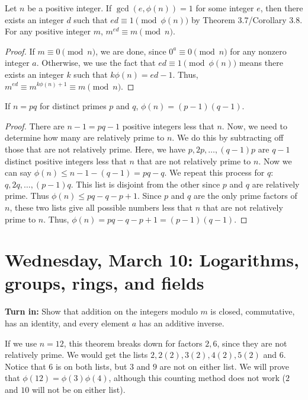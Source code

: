 \documentclass[letterpaper, 11 pt]{article}
\begin{document}
\begin{lem}
Let $n$ be a positive integer. If $\gcd(e, \phi(n))=1$ for some integer $e$, then there exists an integer $d$ such that $ed\equiv 1 \pmod{\phi(n)}$ by Theorem 3.7/Corollary 3.8. For any positive integer $m$, $m^{ed}\equiv m\pmod n$.
\end{lem}
\begin{proof}
 If $m\equiv 0 \pmod n$, we are done, since $0^{a}\equiv 0\pmod n$ for any nonzero integer $a$. Otherwise, we use the fact that $ed\equiv 1 \pmod{\phi(n)}$ means there exists an integer $k$ such that $k\phi(n)=ed-1$. Thus, $m^{ed}\equiv m^{k\phi(n)+1}\equiv m\pmod n$.
\end{proof}

\begin{thm}[Theorem 5.6]
 If $n=pq$ for distinct primes $p$ and $q$, $\phi(n)=(p-1)(q-1)$.
\end{thm}
\begin{proof}
 There are $n-1=pq-1$ positive integers less that $n$. Now, we need to determine how many are relatively prime to $n$. We do this by subtracting off those that are not relatively prime. Here, we have $p,2p,\dots,(q-1)p$ are $q-1$ distinct positive integers less that $n$ that are not relatively prime to $n$. Now we can say $\phi(n)\leq n-1-(q-1)=pq-q$. We repeat this process for $q$: $q,2q,\dots, (p-1)q$. This list is disjoint from the other since $p$ and $q$ are relatively prime. Thus $\phi(n)\leq pq-q-p+1$. Since $p$ and $q$ are the only prime factors of $n$, these two lists give all possible numbers less that $n$ that are not relatively prime to $n$. Thus, $\phi(n)=pq-q-p+1=(p-1)(q-1)$.
\end{proof}
\section{Wednesday, March 10: Logarithms, groups, rings, and fields}
{\bf Turn in:} Show that addition on the integers modulo $m$ is closed, commutative, has an identity, and every element $a$ has an additive inverse.


If we use $n=12$, this theorem breaks down for factors $2,6$, since they are not relatively prime. We would get the lists $2,2(2), 3(2), 4(2), 5(2)$ and $6$. Notice that $6$ is on both lists, but $3$ and $9$ are not on either list. We will prove that $\phi(12)=\phi(3)\phi(4)$, although this counting method does not work ($2$ and $10$ will not be on either list).
\end{document}
